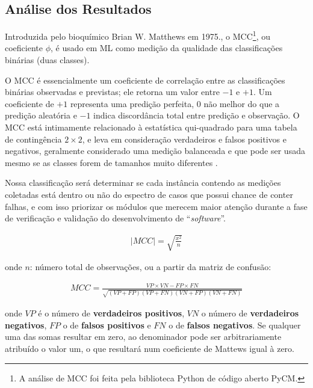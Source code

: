\documentclass[10pt]{article}
\begin{document}
    \subsection{Análise dos Resultados}

        Introduzida pelo bioquímico Brian W. Matthews em 1975., o \gls{MCC}\footnote{A análise de \gls{MCC} foi feita pela biblioteca Python de código aberto PyCM\cite{Haghighi2018}.}, ou coeficiente $\phi$, é usado em \gls{ML} como medição da qualidade das classificações binárias (duas classes).

        O \gls{MCC} é essencialmente um coeficiente de correlação entre as classificações binárias observadas e previstas; ele retorna um valor entre $-1$ e $+1$. Um coeficiente de $+1$ representa uma predição perfeita, $0$ não melhor do que a predição aleatória e $-1$ indica discordância total entre predição e observação. O \gls{MCC} está intimamente relacionado à estatística qui-quadrado para uma tabela de contingência $2 \times 2$, e leva em consideração verdadeiros e falsos positivos e negativos, geralmente considerado uma medição balanceada e que pode ser usada mesmo se as classes forem de tamanhos muito diferentes \cite{boughorbel2017optimal}.

        Nossa classificação será determinar se cada instância contendo as medições coletadas está dentro ou não do espectro de casos que possui chance de conter falhas, e com isso priorizar os módulos que merecem maior atenção durante a fase de verificação e validação do desenvolvimento de ``\textit{software}''.

        \begin{align*}
            | MCC | = \sqrt{\frac{x^2}{n}}
        \end{align*}

        \noindent onde $n$: número total de observações, ou a partir da matriz de confusão:

        \begin{align*}
            MCC = \frac{VP \times VN - FP \times FN}{\sqrt{(VP + FP) (VP + FN) (VN + FP) (VN + FN)}}
        \end{align*}

        \noindent onde $VP$ é o número de \textbf{verdadeiros positivos}, $VN$ o número de \textbf{verdadeiros negativos}, $FP$ o de \textbf{falsos positivos} e $FN$ o de \textbf{falsos negativos}. Se qualquer uma das somas resultar em zero, ao denominador pode ser arbitrariamente atribuído o valor um, o que resultará num coeficiente de Mattews igual à zero.
\end{document}
